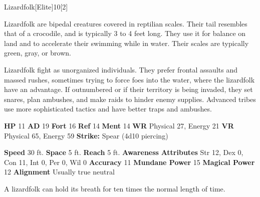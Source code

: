   \begin{monsection}{Lizardfolk}[Elite]{10}[2]
    \vspace{-1em}\vspace{-1em}
    \vspace{0em}

    
    Lizardfolk are bipedal creatures covered in reptilian scales.
    Their tail resembles that of a crocodile, and is typically 3 to 4 feet long.
    They use it for balance on land and to accelerate their swimming while in water.
    Their scales are typically green, gray, or brown.

    Lizardfolk fight as unorganized individuals.
    They prefer frontal assaults and massed rushes, sometimes trying to force foes into the water, where the lizardfolk have an advantage.
    If outnumbered or if their territory is being invaded, they set snares, plan ambushes, and make raids to hinder enemy supplies.
    Advanced tribes use more sophisticated tactics and have better traps and ambushes.
  
    

    \begin{spellcontent}
      \begin{spelltargetinginfo}
        \pari \textbf{HP} 11 \monsep
          \textbf{AD} 19 \monsep
          \textbf{Fort} 16 \monsep
          \textbf{Ref} 14 \monsep
          \textbf{Ment} 14
        \pari \textbf{WR} Physical 27, Energy 21 \monsep
        \textbf{VR} Physical 65, Energy 59
        \pari \textbf{Strike:}
            Spear  (4d10 piercing)
      \end{spelltargetinginfo}
    \end{spellcontent}
    \begin{monsterfooter}
      \pari \textbf{Speed} 30 ft. \monsep
        \textbf{Space} 5 ft. \monsep
        \textbf{Reach} 5 ft.
      \pari \textbf{Awareness} 
      \pari \textbf{Attributes}
        Str 12, Dex 0,
        Con 11, Int 0,
        Per 0, Wil 0
      \pari \textbf{Accuracy} 11 \monsep
        \textbf{Mundane Power} 15 \monsep
      \textbf{Magical Power} 12
      \pari \textbf{Alignment} Usually true neutral
    \end{monsterfooter}
  \end{monsection}
   A lizardfolk can hold its breath for ten times the normal length of time.
  
